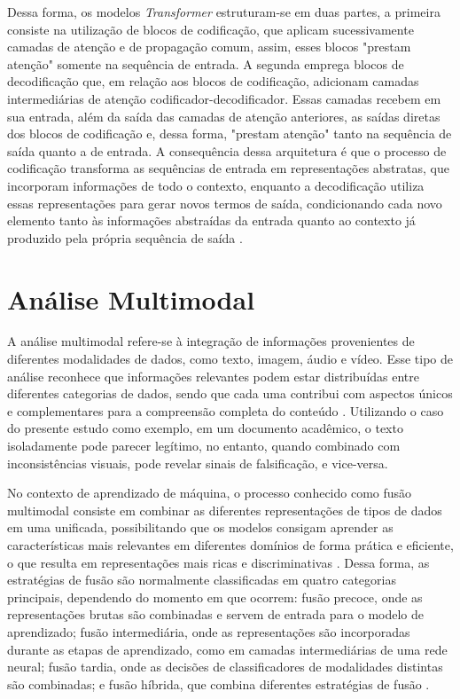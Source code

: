 Dessa forma, os modelos \textit{Transformer} estruturam-se em duas partes, a primeira consiste na utilização de blocos de codificação, que aplicam sucessivamente camadas de atenção e de propagação comum, assim, esses blocos "prestam atenção" somente na sequência de entrada. A segunda emprega blocos de decodificação que, em relação aos blocos de codificação, adicionam camadas intermediárias de atenção codificador-decodificador. Essas camadas recebem em sua entrada, além da saída das camadas de atenção anteriores, as saídas diretas dos blocos de codificação e, dessa forma, "prestam atenção" tanto na sequência de saída quanto a de entrada. A consequência dessa arquitetura é que o processo de codificação transforma as sequências de entrada em representações abstratas, que incorporam informações de todo o contexto, enquanto a decodificação utiliza essas representações para gerar novos termos de saída, condicionando cada novo elemento tanto às informações abstraídas da entrada quanto ao contexto já produzido pela própria sequência de saída \cite{transformer}.

\section{Análise Multimodal}

A análise multimodal refere-se à integração de informações provenientes de diferentes modalidades de dados, como texto, imagem, áudio e vídeo. Esse tipo de análise reconhece que informações relevantes podem estar distribuídas entre diferentes categorias de dados, sendo que cada uma contribui com aspectos únicos e complementares para a compreensão completa do conteúdo \cite{multimodalsurvey}. Utilizando o caso do presente estudo como exemplo, em um documento acadêmico, o texto isoladamente pode parecer legítimo, no entanto, quando combinado com inconsistências visuais, pode revelar sinais de falsificação, e vice-versa.

No contexto de aprendizado de máquina, o processo conhecido como fusão multimodal consiste em combinar as diferentes representações de tipos de dados em uma unificada, possibilitando que os modelos consigam aprender as características mais relevantes em diferentes domínios de forma prática e eficiente, o que resulta em representações mais ricas e discriminativas \cite{multimodalsurvey,multimodalforgery}. Dessa forma, as estratégias de fusão são normalmente classificadas em quatro categorias principais, dependendo do momento em que ocorrem: fusão precoce, onde as representações brutas são combinadas e servem de entrada para o modelo de aprendizado; fusão intermediária, onde as representações são incorporadas durante as etapas de aprendizado, como em camadas intermediárias de uma rede neural; fusão tardia, onde as decisões de classificadores de modalidades distintas são combinadas; e fusão híbrida, que combina diferentes estratégias de fusão \cite{multimodalsurvey}.

